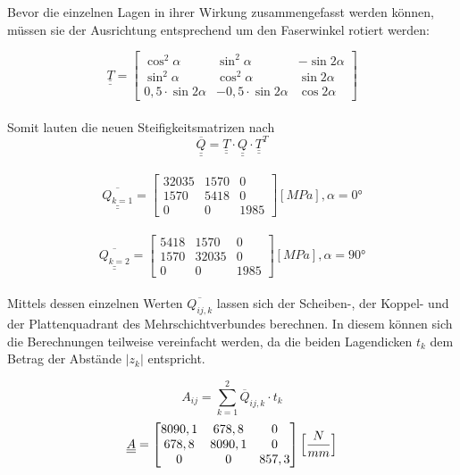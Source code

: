 \noindent Bevor die einzelnen Lagen in ihrer Wirkung zusammengefasst werden können, müssen sie der Ausrichtung entsprechend um den Faserwinkel rotiert werden:

\begin{equation}
	\underline{\underline{T}}=
	\begin{bmatrix}
		\cos^{2}\alpha&\sin^{2}\alpha&-\sin 2\alpha\\
		\sin^{2}\alpha&\cos^{2}\alpha&\sin 2\alpha\\
		0,5\cdot \sin2\alpha&-0,5\cdot\sin2\alpha&\cos 2\alpha
	\end{bmatrix}
\end{equation}\\

\noindent Somit lauten die neuen Steifigkeitsmatrizen nach 
\begin{equation}
	\overline{\underline{\underline{Q}}}=\underline{\underline{T}}\cdot \underline{\underline{Q}} \cdot \underline{\underline{T}}^{T}  
\end{equation}\\

\begin{equation}
\overline{\underline{\underline{Q_{k=1}}}}=
\begin{bmatrix}
	32035 & 1570 & 0\\
	1570 & 5418 & 0\\
	0 & 0 & 1985
\end{bmatrix} [MPa], \alpha = 0°
\end{equation}\\
\begin{equation}
	\overline{\underline{\underline{Q_{k=2}}}}=
	\begin{bmatrix}
		5418 & 1570 & 0\\
		1570 & 32035 & 0\\
		0 & 0 & 1985
	\end{bmatrix} [MPa], \alpha = 90°
\end{equation}\\

\noindent Mittels dessen einzelnen Werten $\overline{Q_{ij, k}}$ lassen sich der Scheiben-, der Koppel- und der Plattenquadrant des Mehrschichtverbundes berechnen. In diesem können sich die Berechnungen teilweise vereinfacht werden, da die beiden Lagendicken $t_{k}$ dem Betrag der Abstände $|z_{k}|$ entspricht.

\begin{equation}
	A_{ij}= \sum_{k=1}^{2} \overline{Q}_{ij,k}\cdot t_{k}
\end{equation}
\begin{equation} \underline{\underline{A}}=
	\begin{bmatrix}
		8090,1 & 678,8 & 0\\
		678,8 & 8090,1 & 0\\
		0 & 0 & 857,3\\
	\end{bmatrix} \Bigl[\frac{N}{mm}\Bigr]
\end{equation}


